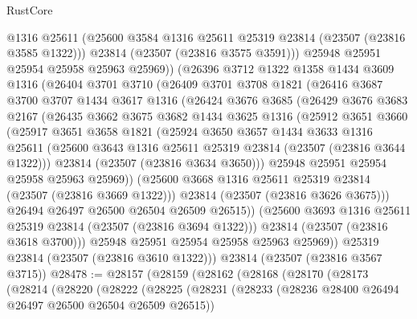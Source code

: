 \begin{lexlean}{RustCore}
\begin{coremodule}
          @1316
          @25611
          (@25600 @3584 @1316 @25611 @25319 @23814 (@23507 (@23816 @3585 @1322)))
          @23814
          (@23507 (@23816 @3575 @3591)))
        @25948
        @25951
        @25954
        @25958
        @25963
        @25969))
    (@26396
      @3712
      @1322
      @1358
      @1434
      @3609
      @1316
      (@26404
        @3701
        @3710
        (@26409
          @3701
          @3708
          @1821
          (@26416
            @3687
            @3700
            @3707
            @1434
            @3617
            @1316
            (@26424
              @3676
              @3685
              (@26429
                @3676
                @3683
                @2167
                (@26435
                  @3662
                  @3675
                  @3682
                  @1434
                  @3625
                  @1316
                  (@25912
                    @3651
                    @3660
                    (@25917
                      @3651
                      @3658
                      @1821
                      (@25924
                        @3650
                        @3657
                        @1434
                        @3633
                        @1316
                        @25611
                        (@25600 @3643 @1316 @25611 @25319 @23814 (@23507 (@23816 @3644 @1322)))
                        @23814
                        (@23507 (@23816 @3634 @3650)))
                      @25948
                      @25951
                      @25954
                      @25958
                      @25963
                      @25969))
                  (@25600 @3668 @1316 @25611 @25319 @23814 (@23507 (@23816 @3669 @1322)))
                  @23814
                  (@23507 (@23816 @3626 @3675)))
                @26494
                @26497
                @26500
                @26504
                @26509
                @26515))
            (@25600 @3693 @1316 @25611 @25319 @23814 (@23507 (@23816 @3694 @1322)))
            @23814
            (@23507 (@23816 @3618 @3700)))
          @25948
          @25951
          @25954
          @25958
          @25963
          @25969))
      @25319
      @23814
      (@23507 (@23816 @3610 @1322)))
    @23814
    (@23507 (@23816 @3567 @3715))
@28478 := @28157
    (@28159
      (@28162
        (@28168
          (@28170
            (@28173
              (@28214
                (@28220
                  (@28222
                    (@28225
                      (@28231
                        (@28233 (@28236 @28400 @26494 @26497 @26500 @26504 @26509 @26515))

\end{coremodule}
\end{lexlean}
